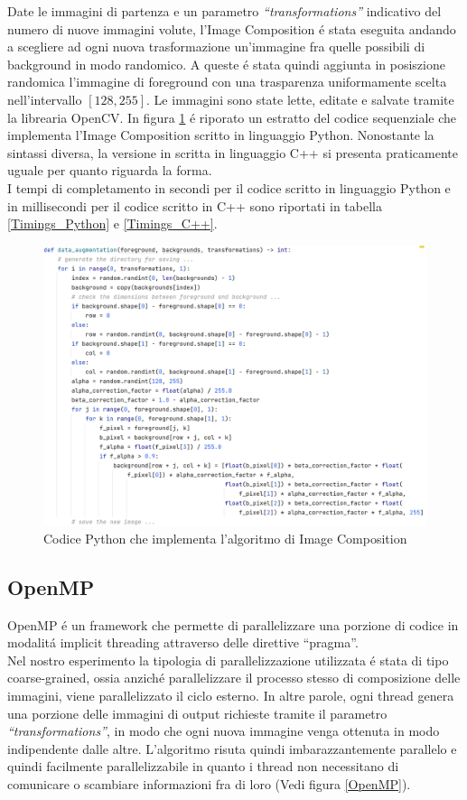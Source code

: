 \documentclass{article}
\begin{document}
Date le immagini di partenza e un parametro \textit{“transformations”} indicativo del numero di nuove immagini volute, l'Image Composition \'e stata eseguita andando a scegliere ad ogni nuova trasformazione un'immagine fra quelle possibili di background in modo randomico. A queste \'e stata quindi aggiunta in posiszione randomica l'immagine di foreground con una trasparenza uniformamente scelta nell'intervallo $ [128,255] $. Le immagini sono state lette, editate e salvate tramite la librearia OpenCV. In figura \ref{Sequential} \'e riporato un estratto del codice sequenziale che implementa l'Image Composition scritto in linguaggio Python. Nonostante la sintassi diversa, la versione in scritta in linguaggio C++ si presenta praticamente uguale per quanto riguarda la forma.\\
I tempi di completamento in secondi per il codice scritto in linguaggio Python e in millisecondi per il codice scritto in C++ sono riportati in tabella \ref{Timings_Python} e \ref{Timings_C++}. 

\begin{figure}[!h]
\centering
\includegraphics[width= 13cm]{"Immagini/Sequential.PNG"}
\caption{Codice Python che implementa l'algoritmo di Image Composition}
\label{Sequential}
\end{figure}

\newpage


\subsection{OpenMP}
OpenMP \'e un framework che permette di parallelizzare una porzione di codice in modalit\'a implicit threading attraverso delle direttive “pragma”.\\
Nel nostro esperimento la tipologia di parallelizzazione utilizzata \'e stata di tipo coarse-grained, ossia anzich\'e parallelizzare il processo stesso di composizione delle immagini, viene parallelizzato il ciclo esterno. In altre parole, ogni thread genera una porzione delle immagini di output richieste tramite il parametro \textit{“transformations”}, in modo che ogni nuova immagine venga ottenuta in modo indipendente dalle altre. L'algoritmo risuta quindi imbarazzantemente parallelo e quindi facilmente parallelizzabile in quanto i thread non necessitano di comunicare o scambiare informazioni fra di loro (Vedi figura \ref{OpenMP}).
\end{document}
